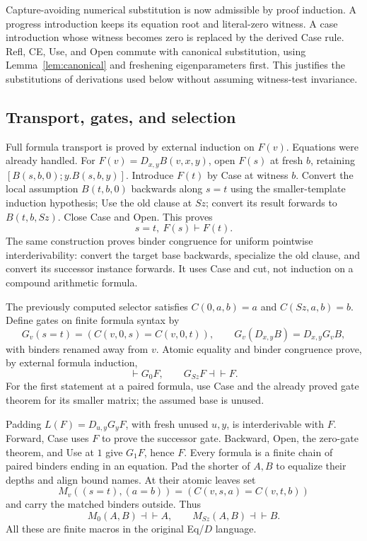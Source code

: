 \documentclass[10pt,letterpaper]{article}
\theoremstyle{definition}
\theoremstyle{remark}
\begin{document}
Capture-avoiding numerical substitution is now admissible by proof
induction. A progress introduction keeps its equation root and literal-zero
witness. A case introduction whose witness becomes zero is replaced by
the derived Case rule. Refl, CE, Use, and Open commute with canonical
substitution, using Lemma~\ref{lem:canonical} and
freshening eigenparameters first. This justifies the substitutions of
derivations used below without assuming witness-test invariance.

\subsection{Transport, gates, and selection}

Full formula transport is proved by external induction on $F(v)$.
Equations were already handled. For $F(v)=D_{x,y}B(v,x,y)$, open
$F(s)$ at fresh $b$, retaining $[B(s,b,0);y.B(s,b,y)]$.
Introduce $F(t)$ by Case at witness $b$. Convert the local assumption
$B(t,b,0)$ backwards along $s=t$ using the smaller-template induction
hypothesis; Use the old clause at $Sz$; convert its result forwards to
$B(t,b,Sz)$. Close Case and Open. This proves
\[
                  s=t,\ F(s)\vdash F(t).
\]
The same construction proves binder congruence for uniform pointwise
interderivability: convert the target base backwards, specialize the old
clause, and convert its successor instance forwards. It uses Case and cut,
not induction on a compound arithmetic formula.

The previously computed selector satisfies $C(0,a,b)=a$ and
$C(Sz,a,b)=b$. Define gates on finite formula syntax by
\[
 G_v(s=t)=(C(v,0,s)=C(v,0,t)),\qquad
 G_v(D_{x,y}B)=D_{x,y}G_vB,
\]
with binders renamed away from $v$. Atomic equality and binder congruence
prove, by external formula induction,
\[
                 \vdash G_0F,\qquad G_{Sz}F\dashv\vdash F.
\]
For the first statement at a paired formula, use Case and the already
proved gate theorem for its smaller matrix; the assumed base is unused.

Padding $L(F)=D_{u,y}G_yF$, with fresh unused $u,y$, is interderivable
with $F$. Forward, Case uses $F$ to prove the successor gate. Backward,
Open, the zero-gate theorem, and Use at $1$ give $G_1F$, hence $F$.
Every formula is a finite chain of paired binders ending in an equation.
Pad the shorter of $A,B$ to equalize their depths and align bound names.
At their atomic leaves set
\[
 M_v((s=t),(a=b))=(C(v,s,a)=C(v,t,b))
\]
and carry the matched binders outside. Thus
\[
                M_0(A,B)\dashv\vdash A,\qquad
                M_{Sz}(A,B)\dashv\vdash B.
\tag{Selector endpoints}
\]
All these are finite macros in the original Eq/$D$ language.
\end{document}
